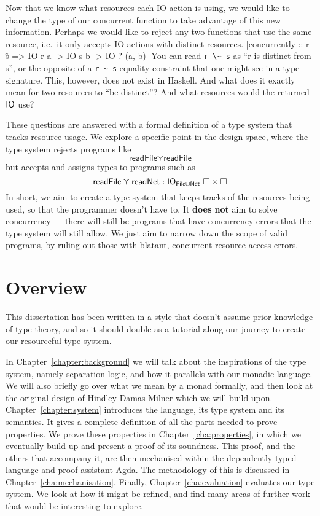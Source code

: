 \documentclass{report}
\begin{document}
Now that we know what resources each IO action is using, we would like to change
the type of our concurrent function to take advantage of this new
information. Perhaps we would like to reject any two functions that use the same
resource, i.e.\ it only accepts IO actions with distinct resources.
|concurrently :: r \~ s => IO r a -> IO s b -> IO ? (a, b)|
You can read \verb$r \~ s$ as ``r is distinct from s'', or the opposite of a
\verb$r ~ s$ equality constraint that one might see in a type signature. This,
however, does not exist in Haskell.  And what does it exactly mean for two
resources to ``be distinct''? And what resources would the returned $\mathsf{IO}$ use?

These questions are answered with a
formal definition of a type system that tracks resource usage. We explore a
specific point in the design space, where the type system rejects programs like
\[ \textsf{readFile} \curlyvee \textsf{readFile} \]
but accepts and assigns types to programs such as
\[ \textsf{readFile} \curlyvee \textsf{readNet} : \mathsf{IO}_{\textsf{File} \cup \textsf{Net}} \
  \square \times \square \]
In short, we aim to create a type system that keeps tracks of the resources
being used, so that the programmer doesn't have to. It \textbf{does not} aim to
solve concurrency --- there will still be programs that have concurrency errors
that the type system will still allow. We just aim to narrow down the scope of
valid programs, by ruling out those with blatant, concurrent resource access
errors. 

\section{Overview}
This dissertation has been written in a style that doesn't assume prior
knowledge of type theory, and so it should double as a tutorial along our
journey to create our resourceful type system.

In Chapter~\ref{chapter:background} we will talk about the inspirations of the
type system, namely separation logic, and how it parallels with our monadic
language. We will also briefly go over what we mean by a monad formally, and
then look at the original design of Hindley-Damas-Milner which we will build
upon.
Chapter~\ref{chapter:system} introduces the language, its type system and its
semantics.  It gives a complete definition of all the parts needed to prove
properties.  We prove these properties in Chapter~\ref{cha:properties}, in which
we eventually build up and present a proof of its soundness. This proof, and the
others that accompany it, are then mechanised within the dependently typed
language and proof assistant Agda. The methodology of this is discussed in
Chapter~\ref{cha:mechanisation}. Finally, Chapter~\ref{cha:evaluation}
evaluates our type system. We look at how it might be refined, and find many
areas of further work that would be interesting to explore.
\end{document}
